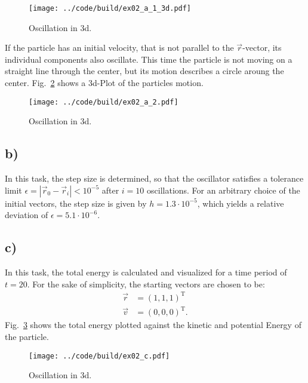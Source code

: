 \begin{figure}[H]
    \centering
    \texttt{[image: ../code/build/ex02\_a\_1\_3d.pdf]}
    \caption{Oscillation in 3d.}
    \label{fig:ex02_a_1_3d}
\end{figure}
\noindent If the particle has an initial velocity, that is not parallel to the $\vec{r}$-vector, its individual components also oscillate. This time the particle is not moving on a straight line through the center, but its motion describes a circle aroung the center. Fig.~\ref{fig:ex02_a_2} shows a 3d-Plot of the particles motion.

\begin{figure}[H]
    \centering
    \texttt{[image: ../code/build/ex02\_a\_2.pdf]}
    \caption{Oscillation in 3d.}
    \label{fig:ex02_a_2}
\end{figure}

\subsection{b)}
In this task, the step size is determined, so that the oscillator satisfies a tolerance limit $\epsilon = |\vec{r}_0  - \vec{r}_i| < 10^{-5}$ after $i=10$ oscillations. For an arbitrary choice of the initial vectors, the step size is given by $h = 1.3 \cdot 10^{-5}$, which yields a relative deviation of $\epsilon = 5.1\cdot 10^{-6}$.

\subsection{c)}
In this task, the total energy is calculated and visualized for a time period of $t=20$. For the sake of simplicity, the starting vectors are chosen to be:
\begin{align}
    \vec{r} &= (1,1,1)^{\text{T}} \\
    \vec{v} &= (0,0,0)^{\text{T}}.
\end{align}
\noindent Fig.~\ref{fig:ex02_c} shows the total energy plotted against the kinetic and potential Energy of the particle. 

\begin{figure}[H]
    \centering
    \texttt{[image: ../code/build/ex02\_c.pdf]}
    \caption{Oscillation in 3d.}
    \label{fig:ex02_c}
\end{figure}
